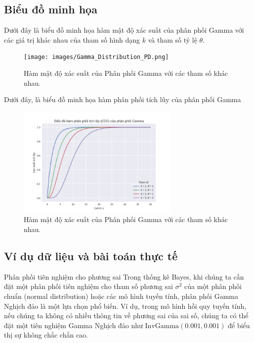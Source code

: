 \subsection{Biểu đồ minh họa}
Dưới đây là biểu đồ minh họa hàm mật độ xác suất của phân phối Gamma với các giá trị khác nhau của tham số hình dạng $k$ và tham số tỷ lệ $\theta$.

\begin{figure}[h!]
	\centering
	\texttt{[image: images/Gamma\_Distribution\_PD.png]} %
	\caption{Hàm mật độ xác suất của Phân phối Gamma với các tham số khác nhau.}
	\label{fig:Gamma_Distribution_PDF}
\end{figure}

Dưới đây, là biểu đồ minh họa hàm phân phối tích lũy của phân phối Gamma

\begin{figure}[h!]
	\centering
	\includegraphics[width=0.7\textwidth]{images/Gamma_Distribution_CDF.png} %
	\caption{Hàm mật độ xác suất của Phân phối Gamma với các tham số khác nhau.}
	\label{fig:Gamma_Distribution_CDF}
\end{figure}

\subsection{Ví dụ dữ liệu và bài toán thực tế}
Phân phối tiên nghiệm cho phương sai
Trong thống kê Bayes, khi chúng ta cần đặt một phân phối tiên nghiệm cho tham số phương sai $\sigma^2$ của một phân phối chuẩn (normal distribution) hoặc các mô hình tuyến tính, phân phối Gamma Nghịch đảo là một lựa chọn phổ biến. Ví dụ, trong mô hình hồi quy tuyến tính, nếu chúng ta không có nhiều thông tin về phương sai của sai số, chúng ta có thể đặt một tiên nghiệm Gamma Nghịch đảo như $\text{InvGamma}(0.001, 0.001)$ để biểu thị sự không chắc chắn cao.

